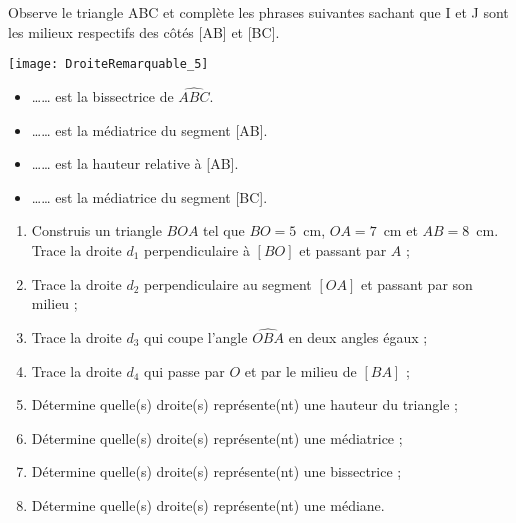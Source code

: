 \begin{exercice}
Observe le triangle ABC et complète les phrases suivantes sachant que I et J sont les milieux respectifs des côtés [AB] et [BC].
\begin{center}
 \texttt{[image: DroiteRemarquable\_5]}
\end{center}

\begin{itemize}
\item \dots \dots \hspace{1em} est la bissectrice de $\widehat{ABC}$.
\item \dots \dots \hspace{1em} est la médiatrice du segment [AB].
\item \dots \dots \hspace{1em} est la hauteur relative à [AB].
\item \dots \dots \hspace{1em} est la médiatrice du segment [BC].
\end{itemize}


\end{exercice}



\begin{exercice}[Vocabulaire] \label{triangles_vocabulaire}
\begin{enumerate}
 \item Construis un triangle $BOA$ tel que $BO = 5$ cm, $OA = 7$ cm et $AB = 8$ cm. Trace la droite $d_1$ perpendiculaire à $[BO]$ et passant par $A$ ;
 \item Trace la droite $d_2$ perpendiculaire au segment $[OA]$ et passant par son milieu ;
 \item Trace la droite $d_3$ qui coupe l'angle $\widehat{OBA}$ en deux angles égaux ;
 \item Trace la droite $d_4$ qui passe par $O$ et par le milieu de $[BA]$ ;
 \item Détermine quelle(s) droite(s) représente(nt) une hauteur du triangle ;
 \item Détermine quelle(s) droite(s) représente(nt) une médiatrice ;
 \item Détermine quelle(s) droite(s) représente(nt) une bissectrice ;
 \item Détermine quelle(s) droite(s) représente(nt) une médiane.
 \end{enumerate}
\end{exercice}


